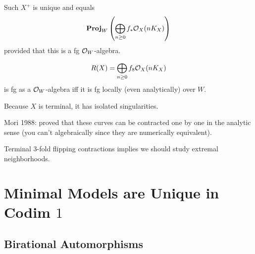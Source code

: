 \documentclass[12pt]{article}
\begin{document}
\begin{lemma}
Such $X^+$ is unique and equals
\[ \mathbf{Proj}_{W}\left( \bigoplus_{n \ge 0} f_* \mathcal{O}_{X}(n K_X) \right) \]
provided that this is a fg $\mathcal{O}_{W}$-algebra.
\end{lemma}

\begin{prop}
\[ R(X) = \bigoplus_{n \ge 0} f_8 \mathcal{O}_{X}(n K_X) \]
is fg as a $\mathcal{O}_{W}$-algebra iff it is fg locally (even analytically) over $W$.
\end{prop}

Because $X$ is terminal, it has isolated singularities. 

Mori 1988: proved that these curves can be contracted one by one in the analytic sense (you can't algebraically since they are numerically equivalent). 


Terminal $3$-fold flipping contractions implies we should study extremal neighborhoods.


\section{Minimal Models are Unique in Codim $1$}

\subsection{Birational Automorphisms}
\end{document}
